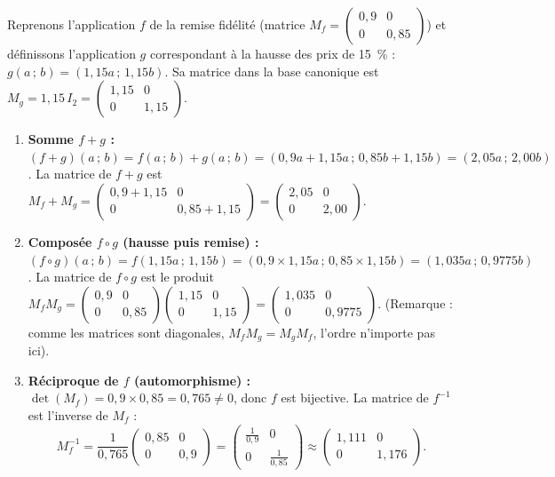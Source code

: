 \documentclass[11pt]{article}
\begin{document}
\begin{exemplebox}
Reprenons l'application $f$ de la remise fidélité (matrice $M_f = \begin{pmatrix} 0{,}9 & 0 \\ 0 & 0{,}85 \end{pmatrix}$) et définissons l'application $g$ correspondant à la hausse des prix de \SI{15}{\percent} : $g(a\,;\,b) = (1{,}15a\,;\,1{,}15b)$. Sa matrice dans la base canonique est $M_g = 1{,}15\,I_2 = \begin{pmatrix} 1{,}15 & 0 \\ 0 & 1{,}15 \end{pmatrix}$.

\begin{enumerate}
\item \textbf{Somme $f+g$ :} $(f+g)(a\,;\,b) = f(a\,;\,b)+g(a\,;\,b) = (0{,}9a+1{,}15a\,;\,0{,}85b+1{,}15b) = (2{,}05a\,;\,2{,}00b)$.
La matrice de $f+g$ est $M_f+M_g = \begin{pmatrix} 0{,}9+1{,}15 & 0 \\ 0 & 0{,}85+1{,}15 \end{pmatrix} = \begin{pmatrix} 2{,}05 & 0 \\ 0 & 2{,}00 \end{pmatrix}$.
\item \textbf{Composée $f \circ g$ (hausse puis remise) :} $(f \circ g)(a\,;\,b) = f(1{,}15a\,;\,1{,}15b) = (0{,}9\times1{,}15a\,;\,0{,}85\times1{,}15b) = (1{,}035a\,;\,0{,}9775b)$.
La matrice de $f \circ g$ est le produit $M_f M_g = \begin{pmatrix} 0{,}9 & 0 \\ 0 & 0{,}85 \end{pmatrix}\begin{pmatrix} 1{,}15 & 0 \\ 0 & 1{,}15 \end{pmatrix} = \begin{pmatrix} 1{,}035 & 0 \\ 0 & 0{,}9775 \end{pmatrix}$.
(Remarque : comme les matrices sont diagonales, $M_f M_g = M_g M_f$, l'ordre n'importe pas ici).
\item \textbf{Réciproque de $f$ (automorphisme) :} $\det(M_f) = 0{,}9 \times 0{,}85 = 0{,}765 \neq 0$, donc $f$ est bijective.
La matrice de $f^{-1}$ est l'inverse de $M_f$ :
\[ M_f^{-1} = \frac{1}{0{,}765}\begin{pmatrix} 0{,}85 & 0 \\ 0 & 0{,}9 \end{pmatrix} = \begin{pmatrix} \frac{1}{0{,}9} & 0 \\ 0 & \frac{1}{0{,}85} \end{pmatrix} \approx \begin{pmatrix} 1{,}111 & 0 \\ 0 & 1{,}176 \end{pmatrix}. \]

\end{enumerate}
\end{exemplebox}
\end{document}
